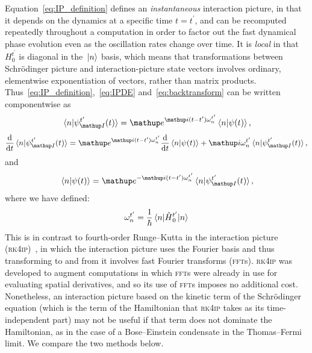 Equation~\eqref{eq:IP_definition} defines an \emph{instantaneous} interaction picture, in that it depends on the dynamics at a specific time $t=t^\prime$, and can be recomputed repeatedly throughout a computation in order to factor out the fast dynamical phase evolution even as the oscillation rates change over time. It is \emph{local} in that $H_0^{t^\prime}$ is diagonal in the $\ket{n}$ basis, which means that transformations between Schr\"odinger picture and interaction-picture state vectors involves ordinary, elementwise exponentiation of vectors, rather than matrix products. Thus~\eqref{eq:IP_definition},~\eqref{eq:IPDE} and~\eqref{eq:backtransform} can be written componentwise as
\begin{align}\label{eq:IP_definition_components}
\braket{n}{\psi_\up{I}^{t^\prime}(t)} = \ee^{\ii (t - t^\prime)\omega_n^{t^\prime}}\braket{n}{\psi(t)},
\end{align}
\begin{align}\label{eq:IPDE_components}
\dv t \braket{n}{\psi_\up{I}^{t^\prime}(t)}
    = \ee^{\ii (t - t^\prime)\omega_n^{t^\prime}}\dv t \braket{n}{\psi(t)}
      + \ii\omega_n^{t^\prime}\braket{n}{\psi_\up{I}^{t^\prime}(t)},
\end{align}
and
\begin{align}\label{eq:backtransform_components}
\braket{n}{\psi(t)} = \ee^{-\ii(t - t^\prime)\omega_n^{t^\prime}}\braket{n}{\psi_\up{I}^{t^\prime}(t)},
\end{align}
where we have defined:
\begin{align}\label{eq:omega}
\omega_n^{t^\prime} = \frac 1\hbar \matrixel{n}{\hat H_0^{t^\prime}}{n}
\end{align}
This is in contrast to fourth-order Runge--Kutta in the interaction picture (\textsc{rk4ip})~\cite{caradoc_davies_thesis}, in which the interaction picture uses the Fourier basis and thus transforming to and from it involves fast Fourier transforms (\textsc{fft}s). \textsc{rk4ip} was developed to augment computations in which \textsc{fft}s were already in use for evaluating spatial derivatives, and so its use of \textsc{fft}s imposes no additional cost. Nonetheless, an interaction picture based on the kinetic term of the Schr\"odinger equation (which is the term of the Hamiltonian that \textsc{rk4ip} takes as its time-independent part) may not be useful if that term does not dominate the Hamiltonian, as in the case of a Bose--Einstein condensate in the Thomas--Fermi limit. We compare the two methods below.

